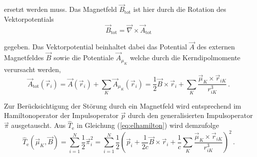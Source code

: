 	ersetzt werden muss. Das Magnetfeld $\vec{B}_{\textrm{tot}}$ ist hier durch die Rotation des Vektorpotentials
	\begin{equation}
	\vec{B}_{\textrm{tot}}=\vec{\nabla} \times \vec{A}_{\textrm{tot}}
	\end{equation}
	
	gegeben. Das Vektorpotential beinhaltet dabei das Potential $\vec{A}$ des externen Magnetfeldes $\vec{B}$ sowie die Potentiale $\vec{A}_{\mu_K}$ welche durch die Kerndipolmomente verursacht werden, 	 
	\begin{equation}\label{eq:atot}
	 \vec{A}_{\textrm{tot}}(\vec{r}_i)=\vec{A}(\vec{r}_i)+\sum_K\vec{A}_{\mu_K}(\vec{r}_i)=\frac{1}{2}\vec{B}\times \vec{r}_i +\sum_K\frac{\vec{\mu}_K\times\vec{r}_{iK}}{r_{iK}^3}\, .
	\end{equation}
	
	Zur Berücksichtigung der Störung durch ein Magnetfeld wird entsprechend im Hamiltonoperator der Impulsoperator $\vec{p}$ durch den generalisierten Impulsoperator $\vec{\pi}$ ausgetauscht. Aus $\hat{T}_\textrm{e}$ in Gleichung (\ref{eq:elhamilton}) wird demzufolge
	\begin{equation}\label{eq:tstör}
	\hat{T}_\textrm{e}(\vec{\mu}_K,\vec{B})=\sum_{i=1}^N\frac{1}{2}\vec{\pi}_i^2=\sum_{i=1}^N\frac{1}{2}\left(\vec{p}_i+\frac{1}{2c}\vec{B}\times \vec{r}_i +\frac{1}{c}\sum_K\frac{\vec{\mu}_K\times\vec{r}_{iK}}{r_{iK}^3}\right)^2\, .
	\end{equation}
	
